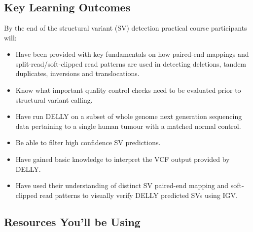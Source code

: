 
\chapter{\moduleTitle}
\newpage

\section{Key Learning Outcomes}
By the end of the structural variant (SV) detection practical course participants will:
\begin{itemize}
  \item Have been provided with key fundamentals on how paired-end mappings and split-read/soft-clipped read patterns are used in detecting deletions, tandem duplicates, inversions and translocations. 
  \item Know what important quality control checks need to be evaluated prior to structural variant calling. 
  \item Have run DELLY on a subset of whole genome next generation sequencing data pertaining to a single human tumour with a matched normal control.
  \item Be able to filter high confidence SV predictions. 
  \item Have gained basic knowledge to interpret the VCF output provided by DELLY.
  \item Have used their understanding of distinct SV paired-end mapping and soft-clipped read patterns to visually verify DELLY predicted SVs using IGV.
\end{itemize}

\section{Resources You'll be Using}
 
